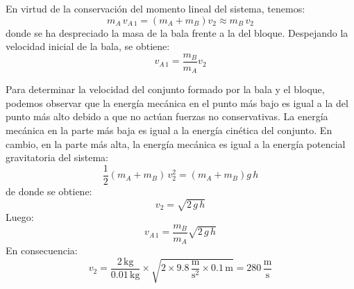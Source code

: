 \documentclass[addpoints]{exam}
\begin{document}
\begin{questions}
    \begin{figure}[h]
    \centering
    \caption{ }
    \label{fig:pendulobal}
    \end{figure}

    \begin{solution}
    En virtud de la conservación del momento lineal del sistema, tenemos: $$m_A \, v_{A \, 1} = \left(m_A + m_B\right) v_2 \approx m_B \, v_2$$ donde se ha despreciado la masa de la bala frente a la del bloque. Despejando la velocidad inicial de la bala, se obtiene: $$v_{A \, 1} = \frac{m_B}{m_A} v_2$$

    Para determinar la velocidad del conjunto formado por la bala y el bloque, podemos observar que la energía mecánica en el punto más bajo es igual a la del punto más alto debido a que no actúan fuerzas no conservativas. La energía mecánica en la parte más baja es igual a la energía cinética del conjunto. En cambio, en la parte más alta, la energía mecánica es igual a la energía potencial gravitatoria del sistema: $$\frac{1}{2} \left(m_A + m_B\right) \, v_2^2 = \left(m_A + m_B\right) g \, h$$ de donde se obtiene: $$v_2 = \sqrt{2 \, g \, h}$$ Luego: $$v_{A \, 1} = \frac{m_B}{m_A} \sqrt{2 \, g \, h}$$ En consecuencia: $$v_2 = \frac{2 \, \text{kg}}{0.01 \, \text{kg}} \times \sqrt{2 \times 9.8 \, \frac{\text{m}}{\text{s}^2} \times 0.1 \, \text{m}} = 280 \, \frac{\text{m}}{\text{s}}$$ 
    \end{solution}


\end{questions}
\end{document}
